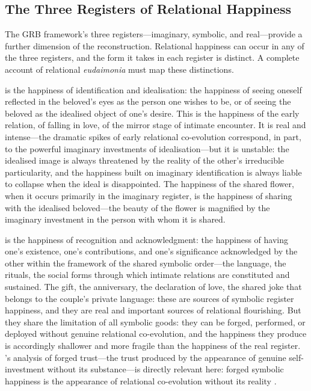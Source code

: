 \subsection{The Three Registers of Relational Happiness}
\label{p14:subsec:threeregisters}

\noindent
The GRB framework's three registers---imaginary, symbolic, and real---provide a further dimension of the reconstruction. Relational happiness can occur in any of the three registers, and the form it takes in each register is distinct. A complete account of relational \emph{eudaimonia} must map these distinctions.

 is the happiness of identification and idealisation: the happiness of seeing oneself reflected in the beloved's eyes as the person one wishes to be, or of seeing the beloved as the idealised object of one's desire. This is the happiness of the early relation, of falling in love, of the mirror stage of intimate encounter. It is real and intense---the dramatic spikes of early relational co-evolution correspond, in part, to the powerful imaginary investments of idealisation---but it is unstable: the idealised image is always threatened by the reality of the other's irreducible particularity, and the happiness built on imaginary identification is always liable to collapse when the ideal is disappointed. The happiness of the shared flower, when it occurs primarily in the imaginary register, is the happiness of sharing with the idealised beloved---the beauty of the flower is magnified by the imaginary investment in the person with whom it is shared.

 is the happiness of recognition and acknowledgment: the happiness of having one's existence, one's contributions, and one's significance acknowledged by the other within the framework of the shared symbolic order---the language, the rituals, the social forms through which intimate relations are constituted and sustained. The gift, the anniversary, the declaration of love, the shared joke that belongs to the couple's private language: these are sources of symbolic register happiness, and they are real and important sources of relational flourishing. But they share the limitation of all symbolic goods: they can be forged, performed, or deployed without genuine relational co-evolution, and the happiness they produce is accordingly shallower and more fragile than the happiness of the real register. 's analysis of forged trust---the trust produced by the appearance of genuine self-investment without its substance---is directly relevant here: forged symbolic happiness is the appearance of relational co-evolution without its reality \parencite{paperxiii}.

